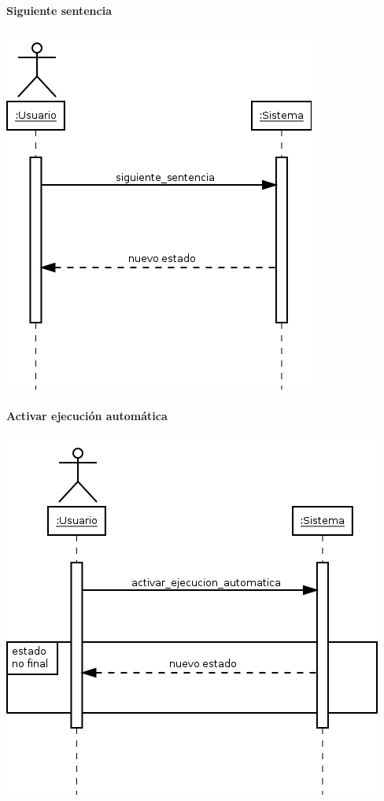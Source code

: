 \paragraph{Siguiente sentencia}
\begin{center}
\includegraphics[scale=0.4]{siguiente_sentencia.png} \\
\end{center}
\paragraph{Activar ejecución automática}
\begin{center}
\includegraphics[scale=0.4]{activar_ejecucion_automatica.png} \\
\end{center}
